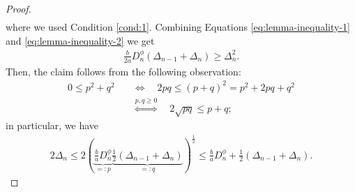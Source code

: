 \documentclass[onecolumn,final,a4paper,13pt,reqno]{siamart}
\begin{document}
\begin{proof}
\begin{align}
	\end{align}
	where we used Condition \ref{cond:1}. Combining Equations \eqref{eq:lemma-inequality-1} and \eqref{eq:lemma-inequality-2} we get
	\begin{align}
		\frac{b}{2a}D_n^\phi(\Delta_{n - 1} + \Delta_n) \geq \Delta_n^2.
	\end{align}
	Then, the claim follows from the following observation:
	\begin{align}
		0 \leq p^2 + q^2 \quad&\Leftrightarrow\quad 2pq \leq (p + q)^2 = p^2 + 2pq + q^2\\
		&\overset{p,q \geq 0}{\Leftrightarrow}\quad 2\sqrt{pq} \leq p + q;
	\end{align}
	in particular, we have
	\begin{align}
		2 \Delta_n \leq 2 \left(\underbrace{\frac{b}{a}D_n^\phi}_{=:p} \underbrace{\frac{1}{2}(\Delta_{n - 1} + \Delta_n)}_{=:q}\right)^{\frac{1}{2}} \leq \frac{b}{a} D_n^\phi + \frac{1}{2}(\Delta_{n - 1} + \Delta_{n}).
	\end{align}
	

\end{proof}
\end{document}
